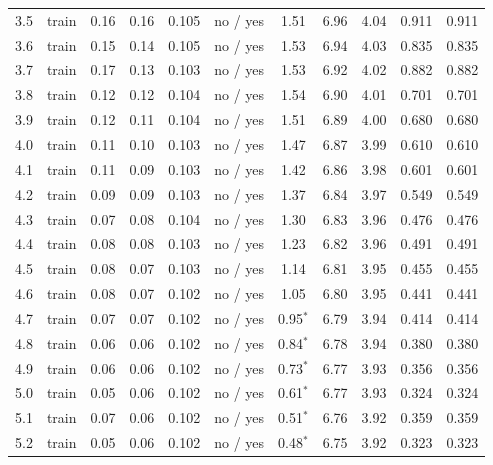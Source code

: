 {\begin{longtable}{llccccccccc}
\rule[-3pt]{0pt}{11.5pt} 3.5 & train & 0.16 & 0.16 & 0.105 & no / yes & 1.51 & 6.96 & 4.04 & 0.911 & 0.911 \\
\rule[-3pt]{0pt}{11.5pt} 3.6 & train & 0.15 & 0.14 & 0.105 & no / yes & 1.53 & 6.94 & 4.03 & 0.835 & 0.835 \\
\rule[-3pt]{0pt}{11.5pt} 3.7 & train & 0.17 & 0.13 & 0.103 & no / yes & 1.53 & 6.92 & 4.02 & 0.882 & 0.882 \\
\rule[-3pt]{0pt}{11.5pt} 3.8 & train & 0.12 & 0.12 & 0.104 & no / yes & 1.54 & 6.90 & 4.01 & 0.701 & 0.701 \\
\rule[-3pt]{0pt}{11.5pt} 3.9 & train & 0.12 & 0.11 & 0.104 & no / yes & 1.51 & 6.89 & 4.00 & 0.680 & 0.680 \\
\rule[-3pt]{0pt}{11.5pt} 4.0 & train & 0.11 & 0.10 & 0.103 & no / yes & 1.47 & 6.87 & 3.99 & 0.610 & 0.610 \\
\rule[-3pt]{0pt}{11.5pt} 4.1 & train & 0.11 & 0.09 & 0.103 & no / yes & 1.42 & 6.86 & 3.98 & 0.601 & 0.601 \\
\rule[-3pt]{0pt}{11.5pt} 4.2 & train & 0.09 & 0.09 & 0.103 & no / yes & 1.37 & 6.84 & 3.97 & 0.549 & 0.549 \\
\rule[-3pt]{0pt}{11.5pt} 4.3 & train & 0.07 & 0.08 & 0.104 & no / yes & 1.30 & 6.83 & 3.96 & 0.476 & 0.476 \\
\rule[-3pt]{0pt}{11.5pt} 4.4 & train & 0.08 & 0.08 & 0.103 & no / yes & 1.23 & 6.82 & 3.96 & 0.491 & 0.491 \\
\rule[-3pt]{0pt}{11.5pt} 4.5 & train & 0.08 & 0.07 & 0.103 & no / yes & 1.14 & 6.81 & 3.95 & 0.455 & 0.455 \\
\rule[-3pt]{0pt}{11.5pt} 4.6 & train & 0.08 & 0.07 & 0.102 & no / yes & 1.05 & 6.80 & 3.95 & 0.441 & 0.441 \\
\rule[-3pt]{0pt}{11.5pt} 4.7 & train & 0.07 & 0.07 & 0.102 & no / yes & 0.95$^{\ast}$ & 6.79 & 3.94 & 0.414 & 0.414 \\
\rule[-3pt]{0pt}{11.5pt} 4.8 & train & 0.06 & 0.06 & 0.102 & no / yes & 0.84$^{\ast}$ & 6.78 & 3.94 & 0.380 & 0.380 \\
\rule[-3pt]{0pt}{11.5pt} 4.9 & train & 0.06 & 0.06 & 0.102 & no / yes & 0.73$^{\ast}$ & 6.77 & 3.93 & 0.356 & 0.356 \\
\rule[-3pt]{0pt}{11.5pt} 5.0 & train & 0.05 & 0.06 & 0.102 & no / yes & 0.61$^{\ast}$ & 6.77 & 3.93 & 0.324 & 0.324 \\
\rule[-3pt]{0pt}{11.5pt} 5.1 & train & 0.07 & 0.06 & 0.102 & no / yes & 0.51$^{\ast}$ & 6.76 & 3.92 & 0.359 & 0.359 \\
\rule[-3pt]{0pt}{11.5pt} 5.2 & train & 0.05 & 0.06 & 0.102 & no / yes & 0.48$^{\ast}$ & 6.75 & 3.92 & 0.323 & 0.323 \\

\end{longtable}}
